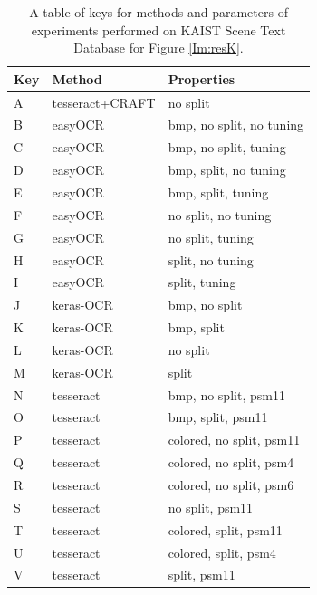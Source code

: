 \begin{table}[!ht]
    \centering
    \begin{tabular}{|l|l|l|}
    \hline
        Key & Method & Properties \\ \hline
        A & tesseract+CRAFT & no split \\ \hline
        B & easyOCR & bmp, no split, no tuning \\ 
        C & easyOCR & bmp, no split, tuning \\ 
        D & easyOCR & bmp, split, no tuning \\ 
        E & easyOCR & bmp, split, tuning \\ 
        F & easyOCR & no split, no tuning \\ 
        G & easyOCR & no split, tuning \\ 
        H & easyOCR & split, no tuning \\ 
        I & easyOCR & split, tuning \\ \hline
        J & keras-OCR & bmp, no split \\ 
        K & keras-OCR & bmp, split \\ 
        L & keras-OCR & no split \\ 
        M & keras-OCR & split \\ \hline
        N & tesseract & bmp, no split, psm11 \\ 
        O & tesseract & bmp, split, psm11 \\ 
        P & tesseract & colored, no split, psm11 \\ 
        Q & tesseract & colored, no split, psm4 \\ 
        R & tesseract & colored, no split, psm6 \\ 
        S & tesseract & no split, psm11 \\ 
        T & tesseract & colored, split, psm11 \\ 
        U & tesseract & colored, split, psm4 \\ 
        V & tesseract & split, psm11 \\ \hline
    \end{tabular}
    \caption{A table of keys for methods and parameters of experiments performed on KAIST Scene Text Database for Figure \ref{Im:resK}.}
    \label{Tab:resK}
\end{table}




